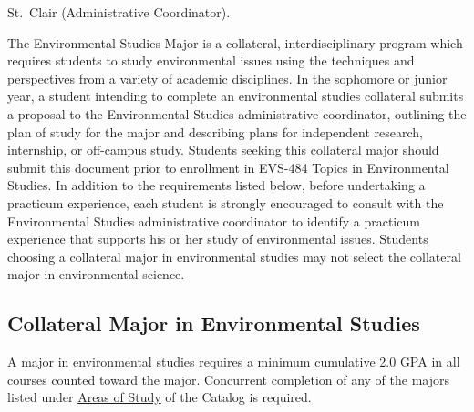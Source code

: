 \documentclass[
  letterpaper,
]{scrbook}
\begin{document}
St.~Clair (Administrative Coordinator).

The Environmental Studies Major is a collateral, interdisciplinary
program which requires students to study environmental issues using the
techniques and perspectives from a variety of academic disciplines. In
the sophomore or junior year, a student intending to complete an
environmental studies collateral submits a proposal to the Environmental
Studies administrative coordinator, outlining the plan of study for the
major and describing plans for independent research, internship, or
off-campus study. Students seeking this collateral major should submit
this document prior to enrollment in EVS-484 Topics in Environmental
Studies. In addition to the requirements listed below, before
undertaking a practicum experience, each student is strongly encouraged
to consult with the Environmental Studies administrative coordinator to
identify a practicum experience that supports his or her study of
environmental issues. Students choosing a collateral major in
environmental studies may not select the collateral major in
environmental science.

\subsection{Collateral Major in Environmental
Studies}\label{collateral-major-in-environmental-studies}

A major in environmental studies requires a minimum cumulative 2.0 GPA
in all courses counted toward the major. Concurrent completion of any of
the majors listed under
\hyperref[Areasux5cux2520Ofux5cux2520Study]{Areas of Study} of the
Catalog is required.
\end{document}
